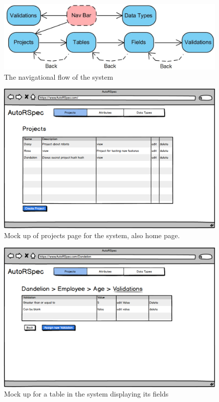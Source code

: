 \documentclass[a4paper,12pt]{article}
\begin{document}
\begin{figure}
\includegraphics[width=\linewidth]{screenshots/pageflow}
\caption{The navigational flow of the system}
\label{fig:nflow}
\end{figure}


\begin{figure}
\includegraphics[width=\linewidth]{screenshots/muhome}
\caption{Mock up of projects page for the system, also home page. }
\label{fig:mu1}
\end{figure}

\begin{figure}
\includegraphics[width=\linewidth]{screenshots/mutable}
\caption{Mock up for a table in the system displaying its fields}
\label{fig:mu2}
\end{figure}
\end{document}
